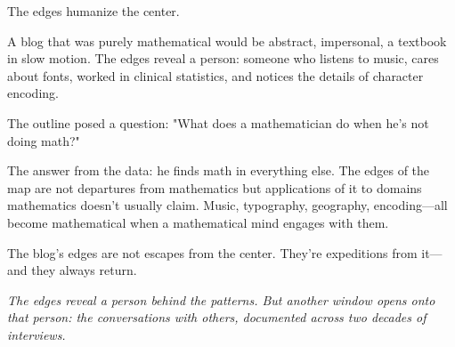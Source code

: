 The edges humanize the center.

A blog that was purely mathematical would be abstract, impersonal, a textbook in slow motion. The edges reveal a person: someone who listens to music, cares about fonts, worked in clinical statistics, and notices the details of character encoding.

The outline posed a question: "What does a mathematician do when he's not doing math?"

The answer from the data: he finds math in everything else. The edges of the map are not departures from mathematics but applications of it to domains mathematics doesn't usually claim. Music, typography, geography, encoding—all become mathematical when a mathematical mind engages with them.

The blog's edges are not escapes from the center. They're expeditions from it—and they always return.

\textit{The edges reveal a person behind the patterns. But another window opens onto that person: the conversations with others, documented across two decades of interviews.}

